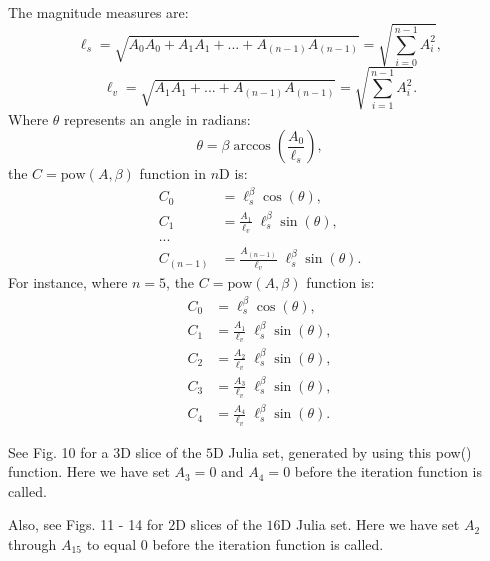 \documentclass[12pt]{article}
\begin{document}
The magnitude measures are:
\begin{equation}
\ell_s = \sqrt{A_0 A_0 + A_1 A_1 + ... + A_{(n-1)} A_{(n-1)}} = \sqrt{\sum _{i=0}^{n-1} A_i^2},
\end{equation}
\begin{equation}
\ell_v = \sqrt{A_1 A_1 + ... + A_{(n-1)} A_{(n-1)}} = \sqrt{\sum _{i=1}^{n-1} A_i^2}.
\end{equation}
Where $\theta$ represents an angle in radians:
\begin{equation}
\theta = \beta \arccos \left(\frac{A_0}{\ell_s} \right),
\end{equation}	
the $C = {\textrm{pow}}(A, \beta)$ function in $n$D is:
\begin{equation}
\begin{split}
C_0 &= \ell_s^{\beta} \cos(\theta), \\
C_1 &= \frac{A_1}{\ell_v}\;\ell_s^{\beta} \sin(\theta), \\
... \\
C_{(n-1)} &= \frac{A_{(n-1)}}{\ell_v}\;\ell_s^{\beta} \sin(\theta).
\end{split}
\end{equation}
For instance, where $n = 5$, the $C = {\textrm{pow}}(A, \beta)$ function is:
\begin{equation}
\begin{split}
C_0 &= \ell_s^{\beta} \cos(\theta), \\
C_1 &= \frac{A_1}{\ell_v}\;\ell_s^{\beta} \sin(\theta), \\
C_2 &= \frac{A_2}{\ell_v}\;\ell_s^{\beta} \sin(\theta), \\
C_3 &= \frac{A_3}{\ell_v}\;\ell_s^{\beta} \sin(\theta), \\
C_4 &= \frac{A_4}{\ell_v}\;\ell_s^{\beta} \sin(\theta).
\end{split}
\end{equation}

See Fig. 10 for a $3$D slice of the $5$D Julia set, generated by using this pow() function.
Here we have set $A_3 = 0$ and $A_4 = 0$ before the iteration function is called.

Also, see Figs. 11 - 14 for $2$D slices of the $16$D Julia set.
Here we have set $A_2$ through $A_{15}$ to equal $0$ before the iteration function is called.
\end{document}
